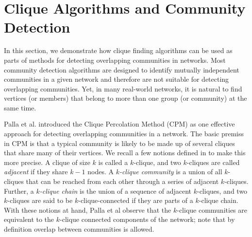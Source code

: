 \section{Clique Algorithms and Community Detection}
\label{sec:applications}

In this section, we demonstrate how clique finding algorithms can be used as 
parts of methods for detecting overlapping communities in networks. 
Most community detection algorithms are designed to identify mutually independent communities in a given network and therefore are not suitable for detecting overlapping communities. Yet, in many real-world networks, it is natural to find vertices (or members) that belong to more than one group (or community) at the same time.


Palla et al.\cite{cite-key} introduced the Clique Percolation Method (CPM) 
as one effective approach for detecting overlapping communities in a network. 
The basic premiss in CPM is that a typical community is likely to be made up of several cliques that share many of their vertices.  
We recall a few notions defined in \cite{cite-key} to make this more precise.
A clique of size $k$ is called a $k$-clique, and   
two $k$-cliques are called {\em adjacent} if they share $k - 1$ nodes. 
A {\em $k$-clique community} is a union of all $k$-cliques that can be reached 
from each other through a series of adjacent $k$-cliques. 
Further, a {\em $k$-clique chain} is the union of a sequence of adjacent $k$-cliques, and
two $k$-cliques are said to be $k$-clique-connected if they are parts of a $k$-clique chain. With these notions at hand, Palla et al observe that the $k$-clique communities are  
equivalent to the $k$-clique connected components of the network; note that by definition
overlap between communities is allowed.

